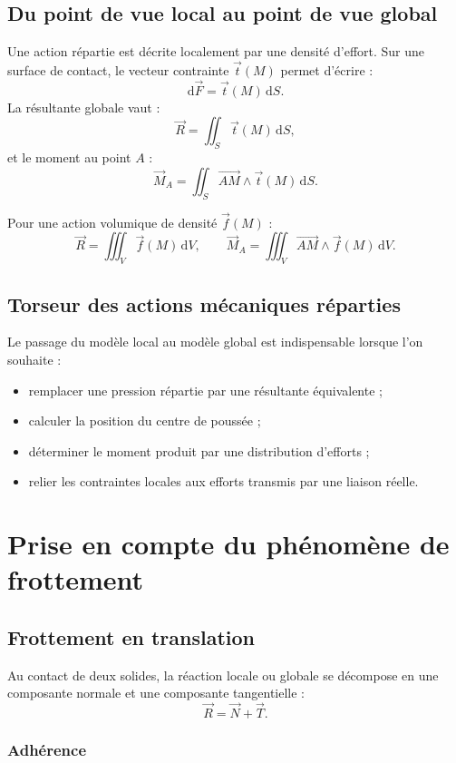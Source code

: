 \subsection{Du point de vue local au point de vue global}

Une action répartie est décrite localement par une densité d'effort. Sur une surface de contact, le vecteur contrainte $\vec t(M)$ permet d'écrire :
\[
\mathrm d\vec F=\vec t(M)\,\mathrm dS.
\]
La résultante globale vaut :
\[
\vec R=\iint_S \vec t(M)\,\mathrm dS,
\]
et le moment au point $A$ :
\[
\vec M_A=\iint_S \overrightarrow{AM}\wedge\vec t(M)\,\mathrm dS.
\]

Pour une action volumique de densité $\vec f(M)$ :
\[
\vec R=\iiint_V \vec f(M)\,\mathrm dV,
\qquad
\vec M_A=\iiint_V \overrightarrow{AM}\wedge\vec f(M)\,\mathrm dV.
\]

\subsection{Torseur des actions mécaniques réparties}

Le passage du modèle local au modèle global est indispensable lorsque l'on souhaite :
\begin{itemize}
  \item remplacer une pression répartie par une résultante équivalente ;
  \item calculer la position du centre de poussée ;
  \item déterminer le moment produit par une distribution d'efforts ;
  \item relier les contraintes locales aux efforts transmis par une liaison réelle.
\end{itemize}

\section{Prise en compte du phénomène de frottement}

\subsection{Frottement en translation}

Au contact de deux solides, la réaction locale ou globale se décompose en une composante normale et une composante tangentielle :
\[
\vec R=\vec N+\vec T.
\]

\subsubsection{Adhérence}

